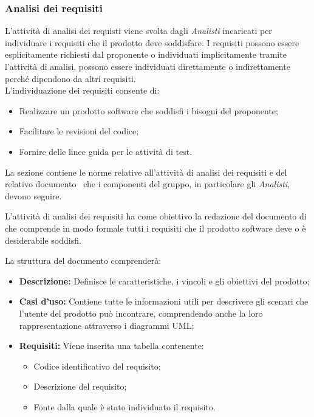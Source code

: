 \subsubsection{Analisi dei requisiti}
L'attività di analisi dei requisti viene svolta dagli \textit{Analisti} incaricati per individuare i requisiti che il prodotto deve soddisfare.
I requisiti possono essere esplicitamente richiesti dal proponente o individuati implicitamente tramite l'attività di analisi, possono essere individuati direttamente o indirettamente perché dipendono da altri requisiti. \\
L'individuazione dei requisiti consente di:
\begin{itemize}
	\item Realizzare un prodotto software che soddisfi i bisogni del proponente;
	\item Facilitare le revisioni del codice;
	\item Fornire delle linee guida per le attività di test.
\end{itemize}

La sezione contiene le norme relative all'attività di analisi dei requisiti e del relativo documento \AdRv\ che i componenti del gruppo, in particolare gli \textit{Analisti}, devono seguire.

L'attività di analisi dei requisiti ha come obiettivo la redazione del documento di \AdRv che comprende in modo formale tutti i requisiti che il prodotto software deve o è desiderabile soddisfi.

La struttura del documento comprenderà:
\begin{itemize}
	\item \textbf{Descrizione:} Definisce le caratteristiche, i vincoli e gli obiettivi del prodotto;
	\item \textbf{Casi d'uso:} Contiene tutte le informazioni utili per descrivere gli scenari che l'utente del prodotto può incontrare, comprendendo anche la loro rappresentazione attraverso i diagrammi UML;
	\item \textbf{Requisiti:} Viene inserita una tabella contenente:
	\begin{itemize}
		\item Codice identificativo del requisito;
		\item Descrizione del requisito;
		\item Fonte dalla quale è stato individuato il requisito. 
	\end{itemize} 
\end{itemize}

